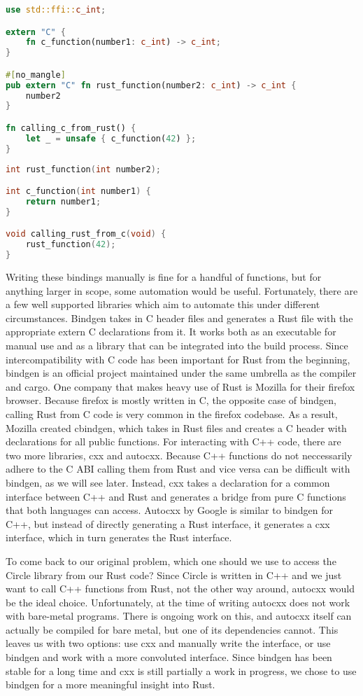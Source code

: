 \begin{lstlisting}[language=Rust,style=colouredRust]
use std::ffi::c_int;

extern "C" {
    fn c_function(number1: c_int) -> c_int;
}

#[no_mangle]
pub extern "C" fn rust_function(number2: c_int) -> c_int {
    number2
}

fn calling_c_from_rust() {
    let _ = unsafe { c_function(42) };
}
\end{lstlisting}

\begin{lstlisting}[language=C]
int rust_function(int number2);

int c_function(int number1) {
    return number1;
}

void calling_rust_from_c(void) {
    rust_function(42);
}
\end{lstlisting}

Writing these bindings manually is fine for a handful of functions, but for anything larger in scope, some automation would be useful.
Fortunately, there are a few well supported libraries which aim to automate this under different circumstances.
Bindgen takes in C header files and generates a Rust file with the appropriate extern C declarations from it.
It works both as an executable for manual use and as a library that can be integrated into the build process.
Since intercompatibility with C code has been important for Rust from the beginning,
bindgen is an official project maintained under the same umbrella as the compiler and cargo.
One company that makes heavy use of Rust is Mozilla for their firefox browser.
Because firefox is mostly written in C, the opposite case of bindgen, calling Rust from C code is very common in the firefox codebase.
As a result, Mozilla created cbindgen, which takes in Rust files and creates a C header with declarations for all public functions.
For interacting with C++ code, there are two more libraries, cxx and autocxx.
Because C++ functions do not neccessarily adhere to the C ABI calling them from Rust and vice versa can be difficult with bindgen, as we will see later.
Instead, cxx takes a declaration for a common interface between C++ and Rust and generates a bridge from pure C functions that both languages can access.
Autocxx by Google is similar to bindgen for C++, but instead of directly generating a Rust interface, it generates a cxx interface, which in turn generates the Rust interface.

To come back to our original problem, which one should we use to access the Circle library from our Rust code?
Since Circle is written in C++ and we just want to call C++ functions from Rust, not the other way around, autocxx would be the ideal choice.
Unfortunately, at the time of writing autocxx does not work with bare-metal programs.
There is ongoing work on this, and autocxx itself can actually be compiled for bare metal, but one of its dependencies cannot.
This leaves us with two options: use cxx and manually write the interface, or use bindgen and work with a more convoluted interface.
Since bindgen has been stable for a long time and cxx is still partially a work in progress, we chose to use bindgen for a more meaningful insight into Rust.

